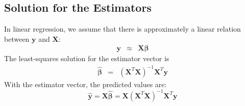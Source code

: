 \documentclass[11pt]{article}
\theoremstyle{remark}
\begin{document}
\subsection{Solution for the Estimators}
In linear regression, we assume that there is approximately a linear relation between $\mathbf{y}$ and $\mathbf{X}$:
\begin{eqnarray}
\mathbf{y} &\approx& \mathbf{X}\boldsymbol{\beta}
\end{eqnarray}
The least-squares solution for the estimator vector is
\begin{eqnarray}
\boldsymbol{\hat{\beta}} &=& \left(\mathbf{X}^T\mathbf{X}\right)^{-1}\mathbf{X}^T\mathbf{y}
\label{EstimatorSolution}
\end{eqnarray}
With the estimator vector, the predicted values are:
\begin{equation}
\mathbf{\hat{y}} = \mathbf{X}\boldsymbol{\hat{\beta}} = \mathbf{X}\left(\mathbf{X}^T\mathbf{X}\right)^{-1}\mathbf{X}^T\mathbf{y}
\end{equation}
\end{document}
